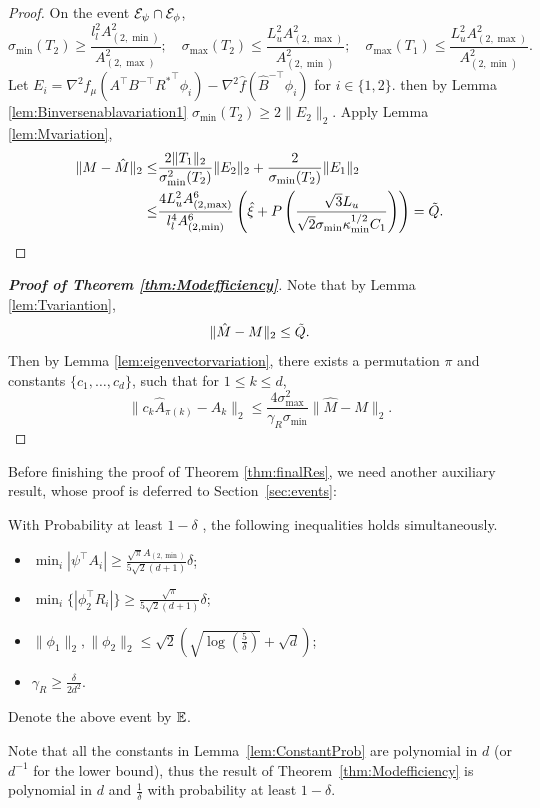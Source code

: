 \begin{proof}
On the event $\mathcal{E}_{\psi}\cap\mathcal{E}_{\phi}$,
\[
\sigma_{\min}(T_2) \ge \frac{l_l^2A^2_{(2,\min)}}{A^2_{(2,\max)}}; \quad \sigma_{\max}(T_2) \le \frac{L_u^2A^2_{(2,\max)}}{A^2_{(2,\min)}};  \quad \sigma_{\max}(T_1) \le \frac{L_u^2A^2_{(2,\max)}}{A^2_{(2,\min)}}. 
\]
Let $E_i = \nabla^2 f_{\mu}(A^{\top}B^{-\top}{R^*}^{\top}\phi_i) - \nabla^2 \hat{f}(\hat{B}^{-\top}\phi_i)$ for  $i\in\{1,2\}$. then by 
Lemma \ref{lem:Binversenablavariation1} $\sigma_{\min}(T_2) \ge 2\|E_2\|_2$.
Apply Lemma \ref{lem:Mvariation},
\begin{align*}
\|M - \hat{M}\|_2 \le &
\frac{2\|T_1\|_2}{\sigma^2_{\min}(T_2)}\|E_2\|_2 + \frac{2}{\sigma_{\min}(T_2)}\|E_1\|_2 \\
\le & \frac{4L_u^2A^6_{(2,\max)}}{l_l^4 A^6_{(2,\min)}}\left(\hat{\xi}
+
P\left(\frac{\sqrt{3}L_u}{\sqrt{2}\sigma_{\min}\kappa_{\min}^{1/2}C_1}\right)\right) = \tilde{Q}.
\end{align*}
\end{proof}
\begin{proof}[{\bf Proof of Theorem \ref{thm:Modefficiency}}]
Note that by Lemma \ref{lem:Tvariantion},
\[
\|\hat{M} - M\|_2 \le \tilde{Q}.
\]
Then by Lemma \ref{lem:eigenvectorvariation}, there exists a permutation $\pi$ and constants $\{c_1,\ldots,c_d\}$, such that for $1\le k\le d$,
\[
\| c_k\hat{A}_{\pi(k)} - A_k\|_2 \le \frac{4\sigma^2_{\max}}{\gamma_R\sigma_{\min}} \|\hat{M} - M\|_2.
\]
\end{proof}

Before finishing the proof of Theorem \ref{thm:finalRes}, we need another auxiliary result, whose proof is deferred to Section~\ref{sec:events}:
\begin{lemma}
\label{lem:ConstantProb}
With Probability at least $1-\delta$ , the following inequalities holds simultaneously.
\begin{itemize}
\vspace{-3mm}
\item $\min_i |\psi^{\top}A_i| \ge \frac{\sqrt{\pi}A_{(2,\min)}}{5\sqrt{2}(d+1)} \delta$;
\item $\min_i \{|\phi_2^{\top}R_i|\} \ge \frac{\sqrt{\pi}}{5\sqrt{2}(d+1)}\delta$;
\item $\|\phi_1\|_2, \|\phi_2\|_2 \le \sqrt{2}\left(\sqrt{\log(\frac{5}{\delta})}+\sqrt{d}\right)$;
\item $\gamma_R \ge\frac{\delta}{2d^2}$.
\end{itemize}
\vspace{-2mm}
\end{lemma}
Denote the above event by $\mathbb{E}$.
\begin{remark}
Note that all the constants in Lemma~\ref{lem:ConstantProb} are polynomial in $d$ (or $d^{-1}$ for the lower bound), thus the result of Theorem~\ref{thm:Modefficiency} is polynomial in $d$ and $\frac{1}{\delta}$ with probability at least $1-\delta$. %
\end{remark}

